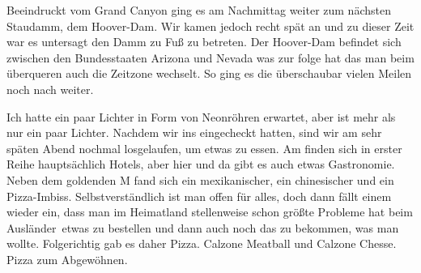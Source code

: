 Beeindruckt vom Grand Canyon ging es am Nachmittag weiter zum nächsten Staudamm, dem Hoover-Dam.
Wir kamen jedoch recht spät an und zu dieser Zeit war es untersagt den Damm zu Fuß zu betreten.
Der Hoover-Dam befindet sich zwischen den Bundesstaaten Arizona und Nevada was zur folge hat das man beim überqueren auch die Zeitzone wechselt.
So ging es die überschaubar vielen Meilen noch nach  weiter.

\newpage

Ich hatte ein paar Lichter in Form von Neonröhren erwartet, aber  ist mehr als nur ein paar Lichter.
Nachdem wir ins  eingecheckt hatten, sind wir am sehr späten Abend nochmal losgelaufen, um etwas zu essen.
Am  finden sich in erster Reihe hauptsächlich Hotels, aber hier und da gibt es auch etwas Gastronomie.
Neben dem goldenden M fand sich ein mexikanischer, ein chinesischer und ein Pizza-Imbiss.
Selbstverständlich ist man offen für alles, doch dann fällt einem wieder ein, dass man im Heimatland stellenweise schon größte Probleme hat beim \glqq Ausländer\grqq \, etwas zu bestellen und dann auch noch das zu bekommen, was man wollte.
Folgerichtig gab es daher Pizza.
Calzone Meatball und Calzone Chesse.
Pizza zum Abgewöhnen.
